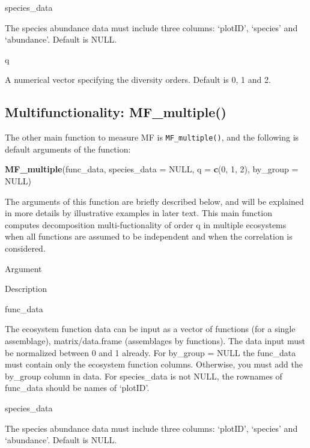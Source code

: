 \documentclass[
]{article}
\newenvironment{Shaded}{\begin{snugshade}}{\end{snugshade}}
\newcommand{\AttributeTok}[1]{\textcolor[rgb]{0.13,0.29,0.53}{#1}}
\newcommand{\ConstantTok}[1]{\textcolor[rgb]{0.56,0.35,0.01}{#1}}
\newcommand{\DecValTok}[1]{\textcolor[rgb]{0.00,0.00,0.81}{#1}}
\newcommand{\FunctionTok}[1]{\textcolor[rgb]{0.13,0.29,0.53}{\textbf{#1}}}
\newcommand{\NormalTok}[1]{#1}
\begin{document}
species\_data

The species abundance data must include three columns: `plotID',
`species' and `abundance'. Default is NULL.

q

A numerical vector specifying the diversity orders. Default is 0, 1 and
2.

\hypertarget{multifunctionality-mf_multiple}{%
\subsection{Multifunctionality:
MF\_multiple()}\label{multifunctionality-mf_multiple}}

The other main function to measure MF is \texttt{MF\_multiple()}, and
the following is default arguments of the function:

\begin{Shaded}
\begin{Highlighting}[]
\FunctionTok{MF\_multiple}\NormalTok{(func\_data, }\AttributeTok{species\_data =} \ConstantTok{NULL}\NormalTok{, }\AttributeTok{q =} \FunctionTok{c}\NormalTok{(}\DecValTok{0}\NormalTok{, }\DecValTok{1}\NormalTok{, }\DecValTok{2}\NormalTok{), }\AttributeTok{by\_group =} \ConstantTok{NULL}\NormalTok{) }
\end{Highlighting}
\end{Shaded}

The arguments of this function are briefly described below, and will be
explained in more details by illustrative examples in later text. This
main function computes decomposition multi-fuctionality of order q in
multiple ecosystems when all functions are assumed to be independent and
when the correlation is considered.

Argument

Description

func\_data

The ecosystem function data can be input as a vector of functions (for a
single assemblage), matrix/data.frame (assemblages by functions). The
data input must be normalized between 0 and 1 already. For by\_group =
NULL the func\_data must contain only the ecosystem function columns.
Otherwise, you must add the by\_group column in data. For species\_data
is not NULL, the rownames of func\_data should be names of `plotID'.

species\_data

The species abundance data must include three columns: `plotID',
`species' and `abundance'. Default is NULL.
\end{document}
